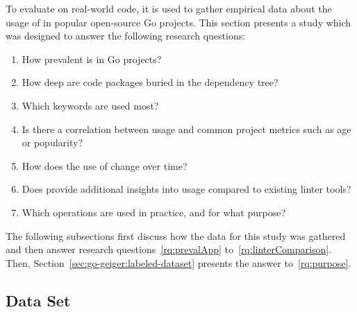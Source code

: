 To evaluate \toolGeiger{} on real-world code, it is used to gather empirical data about the usage of \unsafe{} in
popular open-source Go projects.
This section presents a study which was designed to answer the following research questions:

\begin{enumerate}[left=0.5cm, label={RQ\arabic*}]
    \item How prevalent is \unsafe{} in Go projects? \label{rq:prevalApp}
    \item How deep are \unsafe{} code packages buried in the dependency tree? \label{rq:depsDepth}
    \item Which \unsafe{} keywords are used most? \label{rq:distTypes}
    \item Is there a correlation between \unsafe{} usage and common project metrics such as age or popularity? \label{rq:popularity}
    \item How does the use of \unsafe{} change over time? \label{rq:changeTime}
    \item Does \toolGeiger{} provide additional insights into \unsafe{} usage compared to existing linter tools? \label{rq:linterComparison}
    \item Which \unsafe{} operations are used in practice, and for what purpose? \label{rq:purpose}
\end{enumerate}

The following subsections first discuss how the data for this study was gathered and then answer research
questions~\ref{rq:prevalApp} to~\ref{rq:linterComparison}.
Then, Section~\ref{sec:go-geiger:labeled-dataset} presents the answer to~\ref{rq:purpose}.



\subsection{Data Set}\label{subsec:go-geiger:evaluation:data-set}

